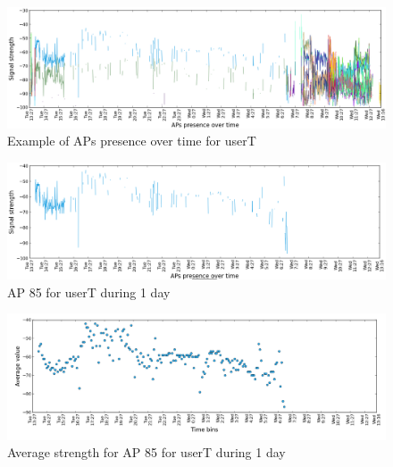 \begin{figure}[!h]
\centering
\includegraphics[width
=\textwidth, height =
0.4\textwidth]{figures/rn_avg/user_1_sorted_1days_plot.png}
\caption{Example of APs presence over time for userT}
\label{user_1_APs_1d}
\end{figure}

\begin{figure}[!h]
\centering
\includegraphics[width
=\textwidth, height =
0.4\textwidth]{figures/rn_avg/user_1_sorted_85_plot.png}
\caption{AP 85 for userT during 1 day}
\label{user_1_AP85_1d}
\end{figure}

\begin{figure}[!h]
\centering
\includegraphics[width
=\textwidth, height =
0.4\textwidth]{figures/rn_avg/user_1_sorted_1days_plot_85_avg_sig.png}
\caption{Average strength for AP 85 for userT during 1 day}
\label{user_1_AP85_avg_1d}
\end{figure}

